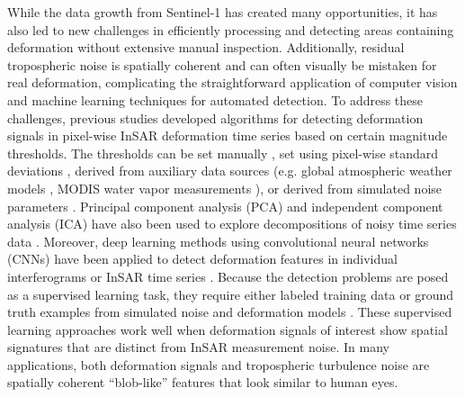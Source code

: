 While the data growth from Sentinel-1 has created many opportunities, it has also led to new challenges in efficiently processing and detecting areas containing deformation without extensive manual inspection.
Additionally, residual tropospheric noise is spatially coherent and can often visually be mistaken for real deformation, complicating the straightforward application of computer vision and machine learning techniques for automated detection.
To address these challenges, previous studies developed algorithms for detecting deformation signals in pixel-wise InSAR deformation time series based on certain magnitude thresholds. The thresholds can be set manually \citep{Raspini2018ContinuousSemiAutomatic}, set using pixel-wise standard deviations \citep{Bekaert2020InsarBasedDetection}, derived from auxiliary data sources (e.g. global atmospheric weather models \citep{Parker2015SystematicAssessmentAtmospheric}, MODIS water vapor measurements \citep{Barnhart2013CharacterizingEstimatingNoise}), or derived from simulated noise parameters \citep{Havazli2021DetectionThresholdEstimates}. Principal component analysis (PCA) and independent component analysis (ICA) have also been used to explore decompositions of noisy time series data \citep{Chaussard2014PredictabilityHydraulicHead, Ebmeier2016ApplicationIndependentComponent, Gaddes2018BlindSignalSeparation}. Moreover, deep learning methods using convolutional neural networks (CNNs) have been applied to detect deformation features in individual interferograms \citep{Anantrasirichai2018ApplicationMachineLearning, Anantrasirichai2019ApplicationConvolutionalNeural} or InSAR time series \citep{RouetLeduc2021AutonomousExtractionMillimeter}. Because the detection problems are posed as a supervised learning task, they require either labeled training data \citep{Anantrasirichai2018ApplicationMachineLearning} or ground truth examples from simulated noise and deformation models \citep{Anantrasirichai2019DeepLearningApproach, RouetLeduc2021AutonomousExtractionMillimeter}. These supervised learning approaches work well when deformation signals of interest show spatial signatures that are distinct from InSAR measurement noise. In many applications, both deformation signals and tropospheric turbulence noise are spatially coherent ``blob-like'' features that look similar to human eyes.
